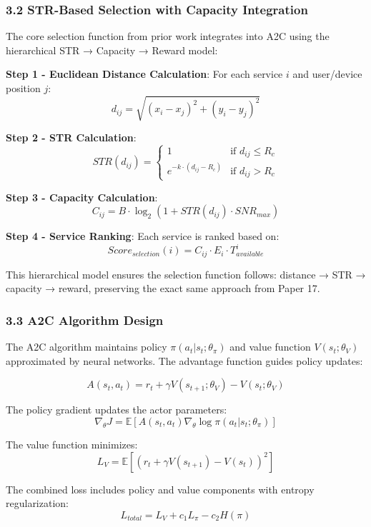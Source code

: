 \hypertarget{str-based-selection-with-capacity-integration}{%
	\subsubsection{3.2 STR-Based Selection with Capacity
		Integration}\label{str-based-selection-with-capacity-integration}}

The core selection function from prior work integrates into A2C using
the hierarchical STR → Capacity → Reward model:

\textbf{Step 1 - Euclidean Distance Calculation}: For each service \(i\)
and user/device position \(j\):
\[d_{ij} = \sqrt{(x_i - x_j)^2 + (y_i - y_j)^2}\]

\textbf{Step 2 - STR Calculation}:
\[STR(d_{ij}) = \begin{cases} 1 & \text{if } d_{ij} \leq R_c \\ e^{-k \cdot (d_{ij} - R_c)} & \text{if } d_{ij} > R_c \end{cases}\]

\textbf{Step 3 - Capacity Calculation}:
\[C_{ij} = B \cdot \log_2(1 + STR(d_{ij}) \cdot SNR_{max})\]

\textbf{Step 4 - Service Ranking}: Each service is ranked based on:
\[Score_{selection}(i) = C_{ij} \cdot E_i \cdot T_{available}^i\]

This hierarchical model ensures the selection function follows: distance
→ STR → capacity → reward, preserving the exact same approach from Paper
17.

\hypertarget{a2c-algorithm-design}{%
	\subsubsection{3.3 A2C Algorithm Design}\label{a2c-algorithm-design}}

The A2C algorithm maintains policy \(\pi(a_t|s_t; \theta_\pi)\) and
value function \(V(s_t; \theta_V)\) approximated by neural networks. The
advantage function guides policy updates:

\[A(s_t, a_t) = r_t + \gamma V(s_{t+1}; \theta_V) - V(s_t; \theta_V)\]

The policy gradient updates the actor parameters:
\[\nabla_\theta J = \mathbb{E}[A(s_t, a_t) \nabla_\theta \log \pi(a_t|s_t; \theta_\pi)]\]

The value function minimizes:
\[L_V = \mathbb{E}[(r_t + \gamma V(s_{t+1}) - V(s_t))^2]\]

The combined loss includes policy and value components with entropy
regularization: \[L_{total} = L_V + c_1 L_\pi - c_2 H(\pi)\]

